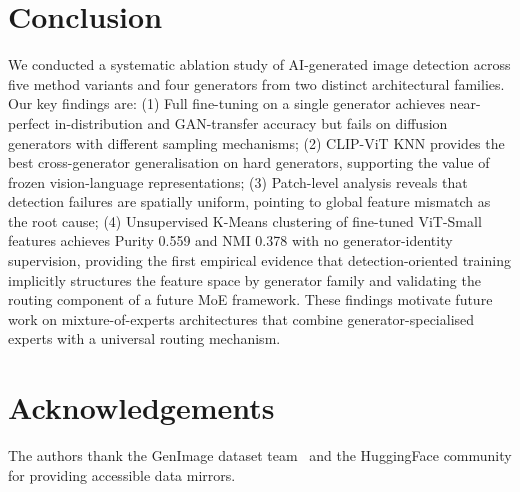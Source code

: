 \documentclass{article}
\begin{document}
\section{Conclusion}

We conducted a systematic ablation study of AI-generated image detection across five method variants and four generators from two distinct architectural families.
Our key findings are:
(1) Full fine-tuning on a single generator achieves near-perfect in-distribution and GAN-transfer accuracy but fails on diffusion generators with different sampling mechanisms;
(2) CLIP-ViT KNN provides the best cross-generator generalisation on hard generators, supporting the value of frozen vision-language representations;
(3) Patch-level analysis reveals that detection failures are spatially uniform, pointing to global feature mismatch as the root cause;
(4) Unsupervised K-Means clustering of fine-tuned ViT-Small features achieves Purity 0.559 and NMI 0.378 with no generator-identity supervision, providing the first empirical evidence that detection-oriented training implicitly structures the feature space by generator family and validating the routing component of a future MoE framework.
These findings motivate future work on mixture-of-experts architectures that combine generator-specialised experts with a universal routing mechanism.

\section*{Acknowledgements}

The authors thank the GenImage dataset team~\cite{zhu2023genimage} and the HuggingFace community for providing accessible data mirrors.

\medskip



\end{document}
